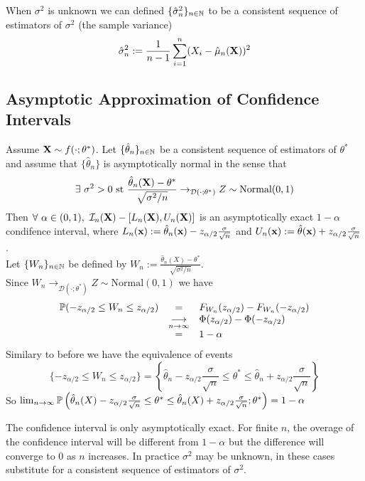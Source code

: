 \documentclass[11pt,a4paper]{article}
\begin{document}
When $\sigma^2$ is unknown we can defined $\{\hat{\sigma}^2_n\}_{n\in\mathbb{N}}$ to be a consistent sequence of estimators of $\sigma^2$ (\eg the sample variance)
$$\hat{\sigma}^2_n:=\frac{1}{n-1}\sum_{i=1}^n(X_i-\hat{\mu}_n(\textbf{X}))^2$$

\subsection{Asymptotic Approximation of Confidence Intervals}

\theorem{}
Assume $\textbf{X}\sim f(\cdot;\theta^*)$. Let $\{\hat{\theta}_n\}_{n\in\mathbb{N}}$ be a consistent sequence of estimators of $\theta^*$ and assume that $\{\hat{\theta}_n\}$ is asymptotically normal in the sense that
$$\exists\ \sigma^2>0\text{ st }\frac{\hat{\theta}_n(\textbf{X})-\theta^*}{\sqrt{\sigma^2/n}}\to_{\mathcal{D}(\cdot;\theta^*)}Z\sim\text{Normal}(0,1)$$
Then $\forall\ \alpha\in(0,1),\ \mathcal{I}_n(\X)-[L_n(\X),U_n(\X)]$ is an asymptotically exact $1-\alpha$ condifence interval, where $L_n(\textbf{x}):=\hat{\theta}_n(\textbf{x})-z_{\alpha/2}\frac{\sigma}{\sqrt{n}}$ and $U_n(\textbf{x}):=\hat{\theta}(\textbf{x})+z_{\alpha/2}\frac{\sigma}{\sqrt{n}}$.\\

Let $\{W_n\}_{n\in\mathbb{N}}$ be defined by $W_n:=\frac{\hat{\theta}_n(X)-\theta^*}{\sqrt{\sigma^2/n}}$.\\
Since $W_n\to_{\mathcal{D}(\cdot;\theta^*)}Z\sim\text{Normal}(0,1)$ we have
\[\begin{array}{rcl}
\mathbb{P}(-z_{\alpha/2}\leq W_n\leq z_{\alpha/2})&=&F_{W_n}(z_{\alpha/2})-F_{W_n}(-z_{\alpha/2})\\
&\underset{n\to\infty}{\longrightarrow}&\Phi(z_{\alpha/2})-\Phi(-z_{\alpha/2})\\
&=&1-\alpha
\end{array}\]
Similary to before we have the equivalence of events
$$\{-z_{\alpha/2}\leq W_n\leq z_{\alpha/2}\}=\left\{\hat{\theta}_n-z_{\alpha/2}\frac{\sigma}{\sqrt{n}}\leq\theta^*\leq\hat{\theta}_n+z_{\alpha/2}\frac{\sigma}{\sqrt{n}}\right\}$$
So $\lim_{n\to\infty}\mathbb{P}\left(\hat{\theta}_n(X)-z_{\alpha/2}\frac{\sigma}{\sqrt{n}}\leq\theta^*\leq\hat{\theta}_n(X)+z_{\alpha/2}\frac{\sigma}{\sqrt{n}};\theta^*\right)=1-\alpha$

The confidence interval is only asymptotically exact. For finite $n$, the overage of the confidence interval will be different from $1-\alpha$ but the difference will converge to 0 as $n$ increases. In practice $\sigma^2$ may be unknown, in these cases substitute for a consistent sequence of estimators of $\sigma^2$.
\end{document}

